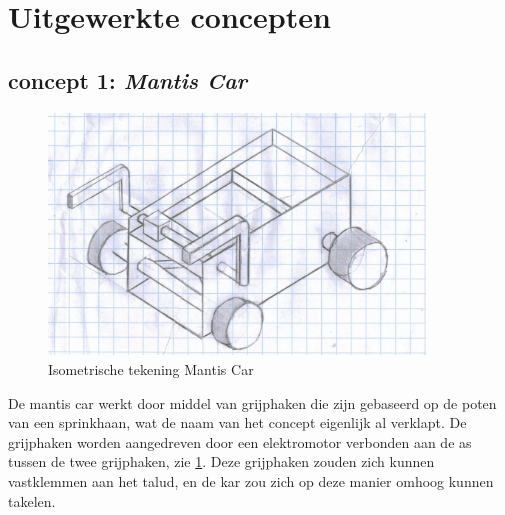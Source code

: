 \section{Uitgewerkte concepten}
\label{se:totaalconcepten}


\subsection{concept 1: \textit{Mantis Car}} 
\label{se:concept_1_mantis_car}

\begin{figure}[H]
    \centering
    \includegraphics[width = 100mm]{04_idee_ontwikkeling/deeloplossing_mantis.JPG}
    \caption{Isometrische tekening Mantis Car}
    \label{fig:deeloplossing_mantis}
\end{figure}

De mantis car werkt door middel van grijphaken die zijn gebaseerd op de poten van een sprinkhaan, wat de naam van het concept eigenlijk al verklapt. De grijphaken worden aangedreven door een elektromotor verbonden aan de as tussen de twee grijphaken, zie \cref{fig:deeloplossing_mantis}. Deze grijphaken zouden zich kunnen vastklemmen aan het talud, en de kar zou zich op deze manier omhoog kunnen takelen.\\

